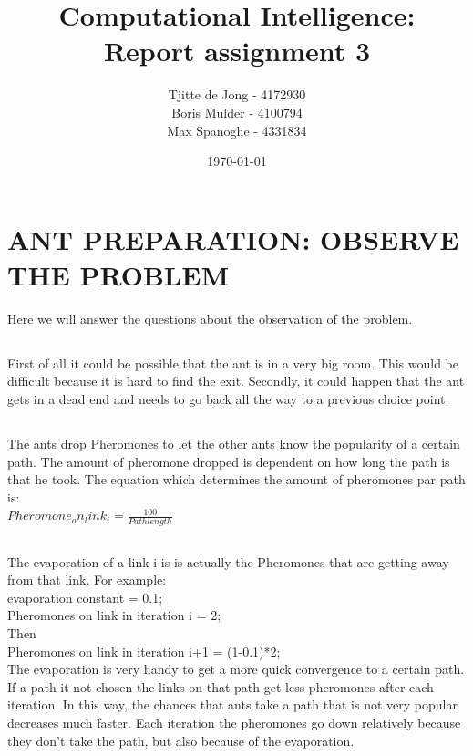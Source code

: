 \documentclass{scrartcl}
\begin{document}
\title{Computational Intelligence:
\\Report assignment 3}
\date{\today{}}

\author{
    \begin{tabular}{l r}
    	\\Tjitte de Jong - 4172930
	\\Boris Mulder - 4100794
        \\Max Spanoghe - 4331834
            \end{tabular}
  }
  
\maketitle \thispagestyle{empty} \pagebreak
  
\section{ANT PREPARATION: OBSERVE THE PROBLEM}
  Here we will answer the questions about the observation of the problem.
  
\subsection{}
First of all it could be possible that the ant is in a very big room. This would be difficult because it is hard to find the exit.
Secondly, it could happen that the ant gets in a dead end and needs to go back all the way to a previous choice point.

\subsection{}
The ants drop Pheromones to let the other ants know the popularity of a certain path. The amount of pheromone dropped is dependent on how long the path is that he took. The equation which determines the amount of pheromones par path is: \\
$Pheromone_on_link_i = \frac{100}{Path length}$

\subsection{}
 The evaporation of a link i is is actually the Pheromones that are getting away from that link. For example:\\
 evaporation constant = 0.1;\\
 Pheromones on link in iteration i = 2;\\
 Then \\
 Pheromones on link in iteration i+1 = (1-0.1)*2;\\
 The evaporation is very handy to get a more quick convergence to a certain path. If a path it not chosen the links on that path get less pheromones after each iteration. In this way, the chances that ants take a path that is not very popular decreases much faster. Each iteration the pheromones go down relatively because they don't take the path, but also because of the evaporation.
 
\end{document}
